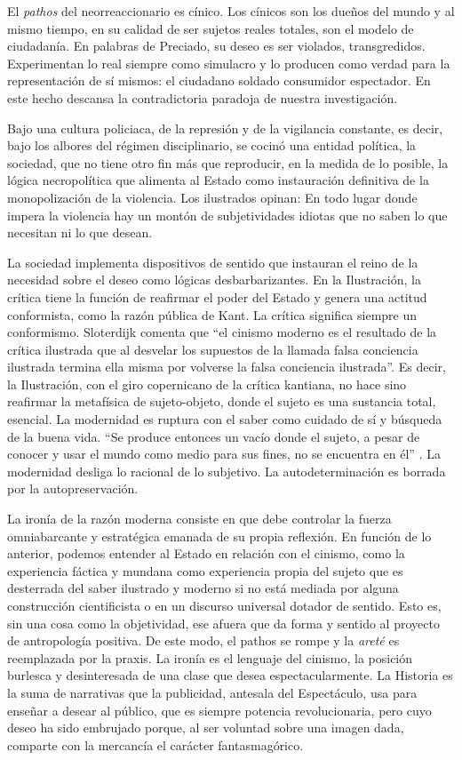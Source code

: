 El \emph{pathos} del neorreaccionario es cínico. Los cínicos son los dueños del mundo y al mismo tiempo, en su calidad de ser sujetos reales totales, son el modelo de ciudadanía. En palabras de Preciado, su deseo es ser violados, transgredidos. Experimentan lo real siempre como simulacro y lo producen como verdad para la representación de sí mismos: el ciudadano soldado consumidor espectador. En este hecho descansa la contradictoria paradoja de nuestra investigación.

Bajo una cultura policiaca, de la represión y de la vigilancia constante, es decir, bajo los albores del régimen disciplinario, se cocinó una entidad política, la sociedad, que no tiene otro fin más que reproducir, en la medida de lo posible, la lógica necropolítica que alimenta al Estado como instauración definitiva de la monopolización de la violencia. Los ilustrados opinan: En todo lugar donde impera la violencia hay un montón de subjetividades idiotas que no saben lo que necesitan ni lo que desean.

La sociedad implementa dispositivos de sentido que instauran el reino de la necesidad sobre el deseo como lógicas desbarbarizantes. En la Ilustración, la crítica tiene la función de reafirmar el poder del Estado y genera una actitud conformista, como la razón pública de Kant. La crítica significa siempre un conformismo. Sloterdijk comenta que \enquote{el cinismo moderno es el resultado de la crítica ilustrada que al desvelar los supuestos de la llamada falsa conciencia ilustrada termina ella misma por volverse la falsa conciencia ilustrada}. Es decir, la Ilustración, con el giro copernicano de la crítica kantiana, no hace sino reafirmar la metafísica de sujeto-objeto, donde el sujeto es una sustancia total, esencial. La modernidad es ruptura con el saber como cuidado de sí y búsqueda de la buena vida. \enquote{Se produce entonces un vacío donde el sujeto, a pesar de conocer y usar el mundo como medio para sus fines, no se encuentra en él} \autocite{anonimoQuinismoImposibleAcerca2010}. La modernidad desliga lo racional de lo subjetivo. La autodeterminación es borrada por la autopreservación.

La ironía de la razón moderna consiste en que debe controlar la fuerza omniabarcante y estratégica emanada de su propia reflexión. En función de lo anterior, podemos entender al Estado en relación con el cinismo, como la experiencia fáctica y mundana como experiencia propia del sujeto que es desterrada del saber ilustrado y moderno si no está mediada por alguna construcción cientificista o en un discurso universal dotador de sentido. Esto es, sin una cosa como la objetividad, ese afuera que da forma y sentido al proyecto de antropología positiva. De este modo, el pathos se rompe y la \emph{areté} es reemplazada por la praxis. La ironía es el lenguaje del cinismo, la posición burlesca y desinteresada de una clase que desea espectacularmente. La Historia es la suma de narrativas que la publicidad, antesala del Espectáculo, usa para enseñar a desear al público, que es siempre potencia revolucionaria, pero cuyo deseo ha sido embrujado porque, al ser voluntad sobre una imagen dada, comparte con la mercancía el carácter fantasmagórico.

